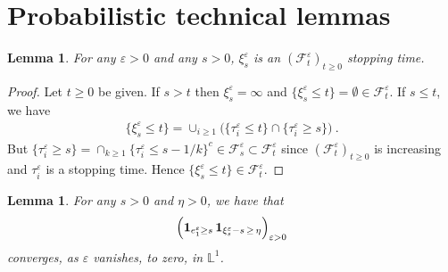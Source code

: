 \documentclass[reqno, 12pt, a4paper]{amsart}
\theoremstyle{plain}
\newtheorem{lemma}[theorem]{Lemma}
\theoremstyle{definition}
\begin{document}
\appendix




\section{Probabilistic technical lemmas}



\begin{lemma}
\label{lem:stoppingtimexi}
For any $\varepsilon>0$ and any $s>0$, $\xi_s^\varepsilon$ is an $(\mathcal F_t^\varepsilon)_{t \ge 0}$ stopping time.
\end{lemma} 

\begin{proof}
Let $t \ge 0$ be given. If $s>t$ then $\xi_s^\varepsilon =\infty$  and $\{ \xi_s^ \varepsilon \le t\} = \emptyset \in \mathcal F_t^\varepsilon$. If $s \le t$, we have 
\begin{equation}
\begin{split}
\{ \xi_s^\varepsilon \le t\} =  \cup_{i \ge 1} \Big (\{ \tau_i^\varepsilon \le t\} \cap \{\tau_i^\varepsilon \ge s\} \Big) \ . 
\end{split}
\end{equation}
But $\{ \tau_i^\varepsilon \ge s\} = \cap_{k \ge 1} \{\tau_i^\varepsilon \le s-1/k\}^c \in \mathcal F^\varepsilon_s \subset \mathcal F_t^\varepsilon$ since $(\mathcal F_t^\varepsilon)_{t \ge 0}$ is increasing and $\tau_i^\varepsilon$ is a stopping time. Hence $\{ \xi_s^ \varepsilon \le t\} \in \mathcal F_t^\varepsilon$.
\end{proof} 


\begin{lemma}
\label{lem:rlt}
For any $s>0$ and $\eta>0$, we have that 
\begin{equation}
\begin{split}
\Big( {\bf 1}_{e^\varepsilon_1 \ge s} \, {\bf 1}_{ \xi_{s}^\varepsilon - s \, \ge \,  \eta} \Big)_{\varepsilon>0} 
\end{split}
\end{equation}
converges, as $\varepsilon$ vanishes, to zero, in $\mathbb L^1$. 
\end{lemma}
\end{document}
